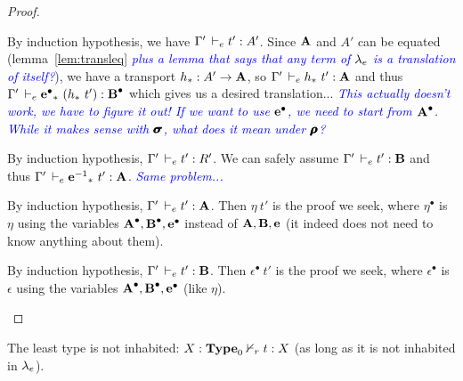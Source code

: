 \documentclass[a4paper,english]{lipics-utf8x}
\newcommand\meta[1]{\noindent\textcolor{blue}{\emph{#1}}}
\begin{document}
\begin{proof}
\begin{caselist}
      \nextcase
      \begin{mathc}
      \end{mathc}
      By induction hypothesis, we have $\Gamma' \,\vdash_e t' : A'$.
      Since $\operatorname{\mathbf{A}}$ and $A'$ can be equated (lemma~\ref{lem:transleq}
      \meta{plus a lemma that says that any term of $\lambda_e$ is a translation of
      itself?}),
      we have a transport $h_* : A' \to \operatorname{\mathbf{A}}$, so
      $\Gamma' \dere h_*\ t' : \mA$ and thus
      $\Gamma' \,\vdash_e \operatorname{\operatorname{\mathbf{e}}^\bullet}_*\ (h_*\ t') : \operatorname{\operatorname{\mathbf{B}}^\bullet}$ which gives us a desired
      translation... \meta{This actually doesn't work, we have to figure it out!
      If we want to use $\operatorname{\operatorname{\mathbf{e}}^\bullet}$, we need to start from $\operatorname{\operatorname{\mathbf{A}}^\bullet}$.
      While it makes sense with $\operatorname{\pmb{\bm{\sigma}}}$, what does it mean under $\operatorname{\pmb{\bm{\rho}}}$?}

      \nextcase
      \begin{mathc}
      \end{mathc}
      By induction hypothesis, $\Gamma' \,\vdash_e t' : R'$.
      We can safely assume $\Gamma' \,\vdash_e t' : \operatorname{\mathbf{B}}$ and thus
      $\Gamma' \,\vdash_e {\operatorname{\mathbf{e}}^{-1}}_*\ t' : \operatorname{\mathbf{A}}$.
      \meta{Same problem...}

      \nextcase
      \begin{mathc}
      \end{mathc}
      By induction hypothesis, $\Gamma' \,\vdash_e t' : \operatorname{\mathbf{A}}$.
      Then $\eta\ t'$ is the proof we seek, where $\eta^\bullet$
      is $\eta$ using the variables $\operatorname{\operatorname{\mathbf{A}}^\bullet},\operatorname{\operatorname{\mathbf{B}}^\bullet},\operatorname{\operatorname{\mathbf{e}}^\bullet}$ instead of
      $\operatorname{\mathbf{A}},\operatorname{\mathbf{B}},\operatorname{\mathbf{e}}$ (it indeed does not need to know anything about them).

      \nextcase
      \begin{mathc}
      \end{mathc}
      By induction hypothesis, $\Gamma' \,\vdash_e t' : \operatorname{\mathbf{B}}$.
      Then $\epsilon^\bullet\ t'$ is the proof we seek, where $\epsilon^\bullet$
      is $\epsilon$ using the variables $\operatorname{\operatorname{\mathbf{A}}^\bullet},\operatorname{\operatorname{\mathbf{B}}^\bullet},\operatorname{\operatorname{\mathbf{e}}^\bullet}$ (like $\eta$).
    \end{caselist}
  \end{proof}

  \begin{corollary}[Consistency]
    \label{cor:cons1}
    The least type is not inhabited: $X : \operatorname{\mathbf{Type}}_0 \nvdash_r t : X$
    (as long as it is not inhabited in $\lambda_e$).
  \end{corollary}
\end{document}
